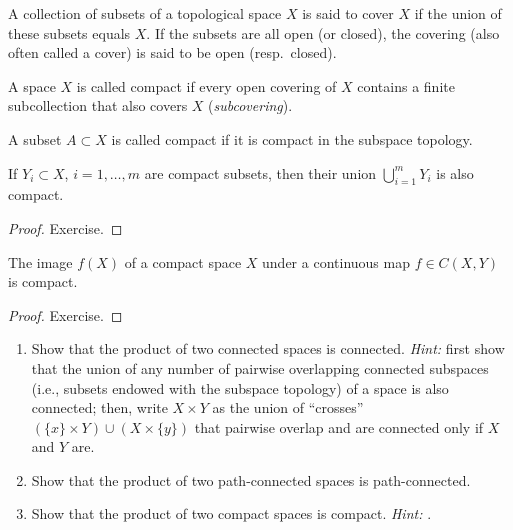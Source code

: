 \begin{defn}
A collection of subsets of a topological space $X$ is said to cover $X$ if the union of these subsets equals $X$. If the subsets are all open (or closed), the covering (also often called a cover) is said to be open (resp.~closed).
\end{defn}

\begin{defn}
A space $X$ is called compact if every open covering of $X$ contains a finite subcollection that also covers $X$ (\emph{subcovering}).
\end{defn}

\begin{defn}
A subset $A\subset X$ is called compact if it is compact in the subspace topology.
\end{defn}

\begin{prop}
If $Y_i\subset X$, $i = 1,\dots, m$ are compact subsets, then their union $\bigcup_{i=1}^m Y_i$ is also compact.
\end{prop}
\begin{proof}
Exercise.
\end{proof}

\begin{prop}\label{prop f(compact)=compact}
The image $f(X)$ of a compact space $X$ under a continuous map $f\in C(X,Y)$ is compact.
\end{prop}
\begin{proof}
Exercise.
\end{proof}

\begin{xca}
\begin{enumerate}
    \item Show that the product of two connected spaces is connected. \emph{Hint:} first show that the union of any number of pairwise overlapping connected subspaces (i.e., subsets endowed with the subspace topology) of a space is also connected; then, write $X\times Y$ as the union of ``crosses'' $(\{x\}\times Y)\cup (X\times \{y\})$ that pairwise overlap and are connected only if $X$ and $Y$ are.
    \item Show that the product of two path-connected spaces is path-connected.
    \item Show that the product of two compact spaces is compact. \emph{Hint:} \cite{compact.proof}.
\end{enumerate}
\end{xca}


